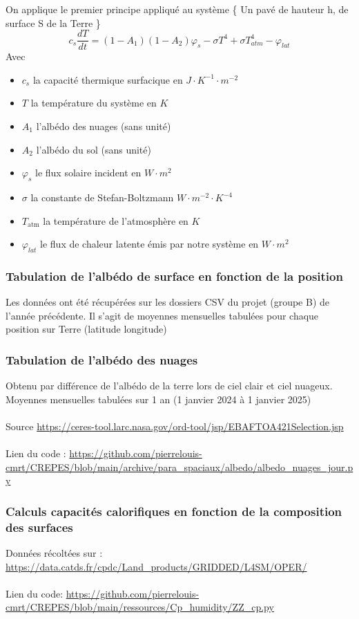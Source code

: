 \documentclass[a4paper,12pt]{article}
\begin{document}
On applique le premier principe appliqué au système \{ Un pavé de hauteur h, de surface S de la Terre \}
\ \ 
\[
c_s \frac{dT}{dt} =(1-A_1)(1-A_2)\varphi_s-\sigma T^4+\sigma T_{atm}^4-\varphi_{lat}
\]
Avec
\begin{itemize}
    \item \(c_s\) la capacité thermique surfacique en \(J\cdot K^{-1}\cdot m^{-2}\)
     \item  \(T\) la température du système en \(K\)
    \item \(A_1\) l'albédo des nuages (sans unité)
    \item \(A_2\) l'albédo du sol (sans unité)
    \item \(\varphi_s\) le flux solaire incident en \(W \cdot m^2\)
 \item \(\sigma\) la constante de Stefan-Boltzmann \(W \cdot m^{-2} \cdot K^{-4}\)
    \item \(T_\text{atm}\) la température de l'atmosphère en \(K\)    
    
    \item \(\varphi_{lat}\) le flux de chaleur latente émis par notre système en \(W \cdot m^2\)
\end{itemize}



\vspace{0.5cm}
\subsubsection{Tabulation de l'albédo de surface en fonction de la position }
Les données ont été récupérées sur les dossiers CSV du projet (groupe B)  de l'année précédente. Il s'agit de moyennes mensuelles tabulées pour chaque position sur Terre (latitude longitude)
\subsubsection{Tabulation de l'albédo des nuages}
Obtenu par différence de l'albédo de la terre lors de ciel clair et ciel nuageux.
Moyennes mensuelles tabulées sur 1 an (1 janvier 2024 à 1 janvier 2025)
\\
\\
Source \url{https://ceres-tool.larc.nasa.gov/ord-tool/jsp/EBAFTOA421Selection.jsp}
\\
\\
Lien du code : \url{https://github.com/pierrelouis-cmrt/CREPES/blob/main/archive/para_spaciaux/albedo/albedo_nuages_jour.py}

\subsubsection{Calculs capacités calorifiques en fonction de la composition des surfaces}
Données récoltées sur : 
\url{https://data.catds.fr/cpdc/Land_products/GRIDDED/L4SM/OPER/}
\\
\\
Lien du code: \url{https://github.com/pierrelouis-cmrt/CREPES/blob/main/ressources/Cp_humidity/ZZ_cp.py}
\end{document}
